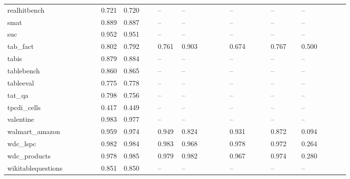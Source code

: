 \begin{table}[htbp]
\begin{tabular}{p{0.121\linewidth}rp{0.108\linewidth}p{0.076\linewidth}p{0.140\linewidth}p{0.121\linewidth}p{0.095\linewidth}p{0.146\linewidth}}
realhitbench & 0.721 & 0.720 & -- & -- & -- & -- & -- \\
smat & 0.889 & 0.887 & -- & -- & -- & -- & -- \\
suc & 0.952 & 0.951 & -- & -- & -- & -- & -- \\
tab\_\allowbreak{}fact & 0.802 & 0.792 & 0.761 & 0.903 & 0.674 & 0.767 & 0.500 \\
tabis & 0.879 & 0.884 & -- & -- & -- & -- & -- \\
tablebench & 0.860 & 0.865 & -- & -- & -- & -- & -- \\
tableeval & 0.775 & 0.778 & -- & -- & -- & -- & -- \\
tat\_\allowbreak{}qa & 0.798 & 0.756 & -- & -- & -- & -- & -- \\
tpcdi\_\allowbreak{}cells & 0.417 & 0.449 & -- & -- & -- & -- & -- \\
valentine & 0.983 & 0.977 & -- & -- & -- & -- & -- \\
walmart\_\allowbreak{}amazon & 0.959 & 0.974 & 0.949 & 0.824 & 0.931 & 0.872 & 0.094 \\
wdc\_\allowbreak{}lspc & 0.982 & 0.984 & 0.983 & 0.968 & 0.978 & 0.972 & 0.264 \\
wdc\_\allowbreak{}products & 0.978 & 0.985 & 0.979 & 0.982 & 0.967 & 0.974 & 0.280 \\
wikitablequestions & 0.851 & 0.850 & -- & -- & -- & -- & -- \\
\bottomrule
\end{tabular}
\end{table}
